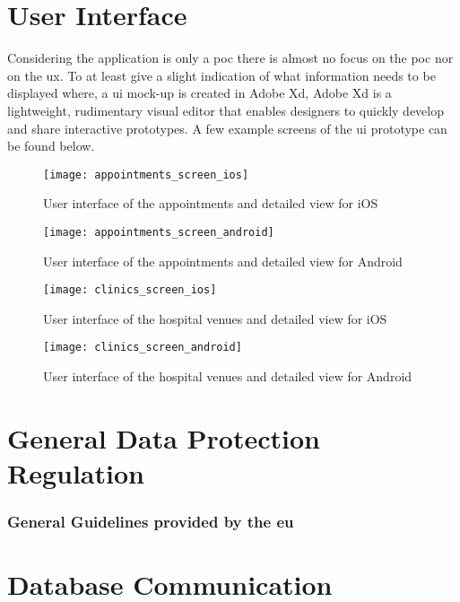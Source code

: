 \section{User Interface}
Considering the application is only a \acrshort{poc} there is almost no focus on the \acrlong{poc} nor on the \acrfull{ux}. To at least give a slight indication of what information needs to be displayed where, a \acrshort{ui} mock-up is created in Adobe Xd, Adobe Xd is a lightweight, rudimentary visual editor that enables designers to quickly develop and share interactive prototypes. A few example screens of the \acrshort{ui} prototype can be found below.
\begin{figure}[H]
\centering
\texttt{[image: appointments\_screen\_ios]}
\caption{User interface of the appointments and detailed view for iOS}
\end{figure}
\begin{figure}[H]
\centering
\texttt{[image: appointments\_screen\_android]}
\caption{User interface of the appointments and detailed view for Android}
\end{figure}
\begin{figure}[H]
\centering
\texttt{[image: clinics\_screen\_ios]}
\caption{User interface of the hospital venues and detailed view for iOS}
\end{figure}
\begin{figure}[H]
\centering
\texttt{[image: clinics\_screen\_android]}
\caption{User interface of the hospital venues and detailed view for Android}
\end{figure}
\section{General Data Protection Regulation}
\subsubsection{General Guidelines provided by the \acrfull{eu}}
\section{Database Communication}
